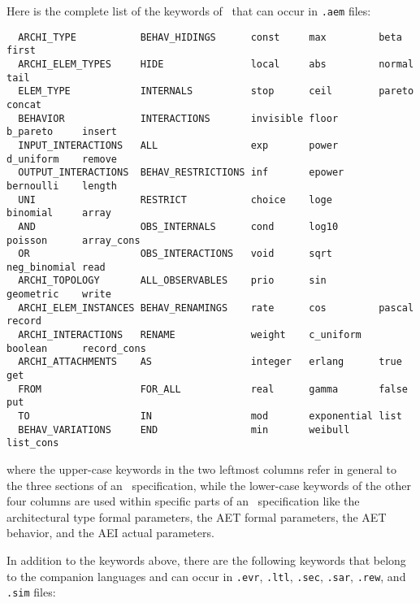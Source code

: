 Here is the complete list of the keywords of \aemilia\ that can occur in {\tt .aem} files:

	\begin{verbatim}
  ARCHI_TYPE           BEHAV_HIDINGS      const     max         beta         first
  ARCHI_ELEM_TYPES     HIDE               local     abs         normal       tail
  ELEM_TYPE            INTERNALS          stop      ceil        pareto       concat
  BEHAVIOR             INTERACTIONS       invisible floor       b_pareto     insert
  INPUT_INTERACTIONS   ALL                exp       power       d_uniform    remove
  OUTPUT_INTERACTIONS  BEHAV_RESTRICTIONS inf       epower      bernoulli    length
  UNI                  RESTRICT           choice    loge        binomial     array
  AND                  OBS_INTERNALS      cond      log10       poisson      array_cons
  OR                   OBS_INTERACTIONS   void      sqrt        neg_binomial read
  ARCHI_TOPOLOGY       ALL_OBSERVABLES    prio      sin         geometric    write
  ARCHI_ELEM_INSTANCES BEHAV_RENAMINGS    rate      cos         pascal       record
  ARCHI_INTERACTIONS   RENAME             weight    c_uniform   boolean      record_cons
  ARCHI_ATTACHMENTS    AS                 integer   erlang      true         get
  FROM                 FOR_ALL            real      gamma       false        put
  TO                   IN                 mod       exponential list
  BEHAV_VARIATIONS     END                min       weibull     list_cons
	\end{verbatim}

\noindent where the upper-case keywords in the two leftmost columns refer in general to the three sections
of an \aemilia\ specification, while the lower-case keywords of the other four columns are used within
specific parts of an \aemilia\ specification like the architectural type formal parameters, the AET formal
parameters, the AET behavior, and the AEI actual parameters.

In addition to the keywords above, there are the following keywords that belong to the companion languages
and can occur in {\tt .evr}, {\tt .ltl}, {\tt .sec}, {\tt .sar}, {\tt .rew}, and {\tt .sim} files:

